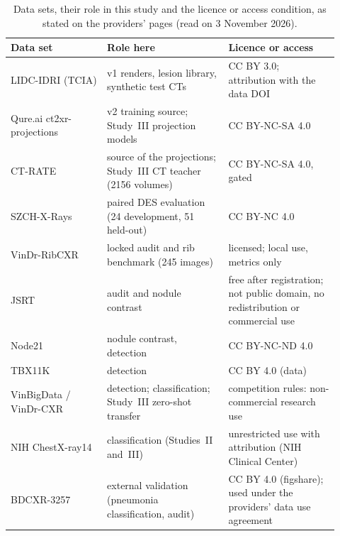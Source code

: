 \begin{table}[!t]
\centering
\caption{Data sets, their role in this study and the licence or access condition, as stated on the providers' pages (read on
3 November 2026).}
\label{tab:data}
\footnotesize
\setlength{\tabcolsep}{3pt}
\renewcommand{\arraystretch}{1.1}
\begin{tabular}{@{}>{\raggedright\arraybackslash}p{0.27\linewidth}>{\raggedright\arraybackslash}p{0.34\linewidth}%
>{\raggedright\arraybackslash}p{0.31\linewidth}@{}}
\toprule
Data set & Role here & Licence or access \\
\midrule
LIDC-IDRI (TCIA) & v1 renders, lesion library, synthetic test CTs & CC BY 3.0; attribution with the data DOI \\
Qure.ai ct2xr-projections & v2 training source; Study~III projection models & CC BY-NC-SA 4.0 \\
CT-RATE & source of the projections; Study~III CT teacher (\num{2156} volumes) & CC BY-NC-SA 4.0, gated \\
SZCH-X-Rays & paired DES evaluation (24 development, 51 held-out) & CC BY-NC 4.0 \\
VinDr-RibCXR & locked audit and rib benchmark (245 images) & licensed; local use, metrics only \\
JSRT & audit and nodule contrast & free after registration; not public domain, no redistribution or commercial use \\
Node21 & nodule contrast, detection & CC BY-NC-ND 4.0 \\
TBX11K & detection & CC BY 4.0 (data) \\
VinBigData / VinDr-CXR & detection; classification; Study~III zero-shot transfer & competition rules: non-commercial research use \\
NIH ChestX-ray14 & classification (Studies~II and~III) & unrestricted use with attribution (NIH Clinical Center) \\
BDCXR-3257 & external validation (pneumonia classification, audit) & CC BY 4.0 (figshare); used under the providers' data use
 agreement \\
\bottomrule
\end{tabular}
\end{table}

